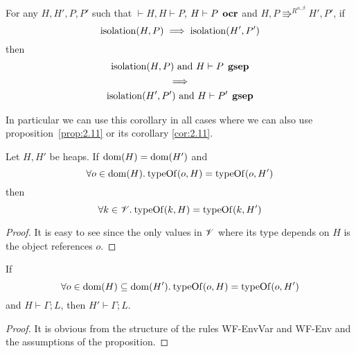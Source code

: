 \begin{corollary} \label{cor:2.9}
  For any $H, H', P, P'$ such that $\vdash H, H \vdash P$, $H \vdash P \tsep
  \ocr$ and $H, P \Rrightarrow^{R^{\alpha, \beta}} H', P'$, if
  \begin{equation*}
      \isolation(H, P) 
      \implies 
      \isolation(H', P')
  \end{equation*}
  then
  \begin{equation*}
    \begin{gathered}
      \isolation(H, P) \text{ and } H \vdash P \tsep \gsep \\
      \implies \\
      \isolation(H', P') \text{ and } H \vdash P' \tsep \gsep
    \end{gathered}
  \end{equation*}
\end{corollary}
\begin{remark}
  In particular we can use this corollary in all cases where we can also use
  proposition~\ref{prop:2.11} or its corollary \ref{cor:2.11}.
\end{remark}

\begin{proposition} \label{prop:2.12}
  Let $H, H'$ be heaps. If $\dom{(H)} = \dom{(H')}$ and
  \begin{equation*}
    \forall o \in \dom{(H)}. \: \typeOf{(o, H)} = \typeOf{(o, H')}
  \end{equation*}
  then 
  \begin{equation*}
    \forall k \in \Values. \: \typeOf{(k, H)} = \typeOf{(k, H')}
  \end{equation*}
\end{proposition}

\begin{proof}
  It is easy to see since the only values in $\Values$ where its type depends on
  $H$ is the object references $o$.
\end{proof}

\begin{proposition} \label{prop:2.19}
  If
  \begin{equation*}
    \forall o \in \dom(H) \subseteq \dom(H'). \: \typeOf(o, H) = \typeOf(o, H')
  \end{equation*}
  and $H \vdash \Gamma; L$, then $H' \vdash \Gamma; L$.
\end{proposition}

\begin{proof}
  It is obvious from the structure of the rules {\sc WF-EnvVar} and {\sc
  WF-Env} and the assumptions of the proposition.
\end{proof}

